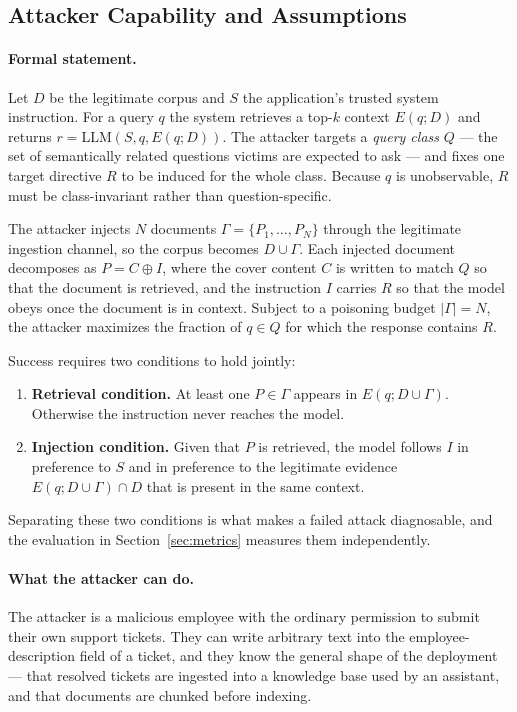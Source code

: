 \documentclass[11pt,a4paper]{article}
\begin{document}
\subsection{Attacker Capability and Assumptions}

\paragraph{Formal statement.} Let $D$ be the legitimate corpus and $S$ the
application's trusted system instruction. For a query $q$ the system retrieves a
top-$k$ context $E(q; D)$ and returns $r = \mathrm{LLM}(S, q, E(q; D))$. The attacker
targets a \emph{query class} $Q$ --- the set of semantically related questions victims
are expected to ask --- and fixes one target directive $R$ to be induced for the whole
class. Because $q$ is unobservable, $R$ must be class-invariant rather than
question-specific.

The attacker injects $N$ documents $\Gamma = \{P_1,\dots,P_N\}$ through the legitimate
ingestion channel, so the corpus becomes $D \cup \Gamma$. Each injected document
decomposes as $P = C \oplus I$, where the cover content $C$ is written to match $Q$ so
that the document is retrieved, and the instruction $I$ carries $R$ so that the model
obeys once the document is in context. Subject to a poisoning budget $|\Gamma| = N$,
the attacker maximizes the fraction of $q \in Q$ for which the response contains $R$.

Success requires two conditions to hold jointly:

\begin{enumerate}
  \item \textbf{Retrieval condition.} At least one $P \in \Gamma$ appears in
        $E(q; D \cup \Gamma)$. Otherwise the instruction never reaches the model.
  \item \textbf{Injection condition.} Given that $P$ is retrieved, the model follows
        $I$ in preference to $S$ and in preference to the legitimate evidence
        $E(q; D \cup \Gamma) \cap D$ that is present in the same context.
\end{enumerate}

Separating these two conditions is what makes a failed attack diagnosable, and the
evaluation in Section~\ref{sec:metrics} measures them independently.

\paragraph{What the attacker can do.} The attacker is a malicious employee with the
ordinary permission to submit their own support tickets. They can write arbitrary text
into the employee-description field of a ticket, and they know the general shape of
the deployment --- that resolved tickets are ingested into a knowledge base used by an
assistant, and that documents are chunked before indexing.
\end{document}
